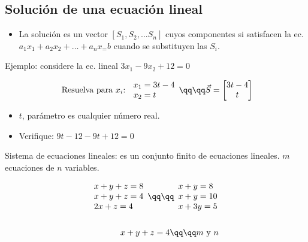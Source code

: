 \subsection{Solución de una ecuación lineal}
\begin{itemize}
    \item La solución es un vector $[S_1,S_2,...S_n]$  cuyos componentes si satisfacen la ec. $a_1x_1+a_2x_2+\dots+a_nx_=b$  cuando se substituyen las $S_i$.
\end{itemize}
Ejemplo: considere la ec. lineal $3x_1-9x_2+12= 0$
\begin{center}
   \begin{align*}
       \text{ Resuelva para $x_i$:  } \begin{array}{l}
           x_1 = 3t-4 \\ 
           x_2= t \\ 
       \end{array} \qq \qq \vec{S} = \begin{bmatrix}
            3t-4 \\ 
            t \\ 
       \end{bmatrix}\\ 
   \end{align*}
   \begin{itemize}
       \item $t$, parámetro es cualquier número real.
       \item Verifique: $9t-12-9t+12=0$ \checkmark  
   \end{itemize}
\end{center}

Sistema de ecuaciones lineales: es un conjunto finito de ecuaciones lineales. $m$ ecuaciones de $n$ variables.

\begin{center}
   \begin{align*}
       \begin{array}{l}
           x + y+z=8 \\ 
           x+y+z=4 \\ 
           2x+z = 4 \\
       \end{array} 
       \qq \qq \begin{array}{l}
           x+y=8 \\ 
           x+y=10 \\ 
           x+3y=5 \\ 
       \end{array} \\ 
       \\ 
       x+y+z=4 \qq \qq \text{$m $ y $n$ } \\ %
   \end{align*}
\end{center}

